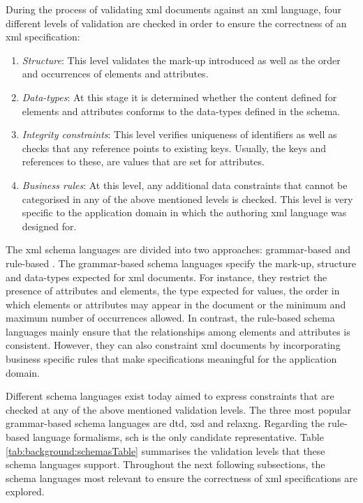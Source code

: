 	During the process of validating \gls{xml} documents against an \gls{xml} language, four different levels of validation \cite{proc:stuhrenberg10} are checked in order to ensure the correctness of an \gls{xml} specification:
	\begin{enumerate}
		\item \emph{Structure}: This level validates the mark-up introduced as well as the order and occurrences of elements and attributes.
		\item \emph{Data-types}: At this stage it is determined whether the content defined for elements and attributes conforms to the data-types defined in the schema. 
		\item \emph{Integrity constraints}: This level verifies uniqueness of identifiers as well as checks that any reference points to existing keys. Usually, the keys and references to these, are values that are set for attributes.
		\item \emph{Business rules}: At this level, any additional data constraints \cite{proc:vandervlist06} that cannot be categorised in any of the above mentioned levels is checked. This level is very specific to the application domain in which the authoring \gls{xml} language was designed for. 
	\end{enumerate}

	The \gls{xml} schema languages are divided into two approaches: grammar-based and rule-based \cite{stuhrenberg13}. The grammar-based schema languages specify the mark-up, structure and data-types expected for \gls{xml} documents. For instance, they restrict the presence of attributes and elements, the type expected for values, the order in which elements or attributes may appear in the document or the minimum and maximum number of occurrences allowed. In contrast, the rule-based schema languages mainly ensure that the relationships among elements and attributes is consistent. However, they can also constraint \gls{xml} documents by incorporating business specific rules that make specifications meaningful for the application domain.

	Different schema languages exist today aimed to express constraints that are checked at any of the above mentioned validation levels. The three most popular grammar-based schema languages are \gls{dtd}, \gls{xsd} and \gls{relaxng}. Regarding the rule-based language formalisms, \gls{sch} is the only candidate representative. Table \ref{tab:background:schemasTable} summarises the validation levels that these schema languages support. Throughout the next following subsections, the schema languages most relevant to ensure the correctness of \gls{xml} specifications are explored.
	

